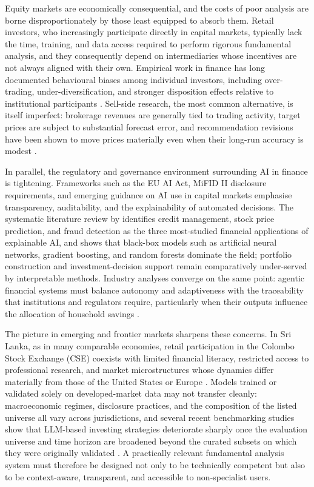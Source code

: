 Equity markets are economically consequential, and the costs of poor analysis are borne disproportionately by those least equipped to absorb them. Retail investors, who increasingly participate directly in capital markets, typically lack the time, training, and data access required to perform rigorous fundamental analysis, and they consequently depend on intermediaries whose incentives are not always aligned with their own. Empirical work in finance has long documented behavioural biases among individual investors, including over-trading, under-diversification, and stronger disposition effects relative to institutional participants \citep{Li2025FSA}. Sell-side research, the most common alternative, is itself imperfect: brokerage revenues are generally tied to trading activity, target prices are subject to substantial forecast error, and recommendation revisions have been shown to move prices materially even when their long-run accuracy is modest \citep{Papasotiriou2024}.

In parallel, the regulatory and governance environment surrounding AI in finance is tightening. Frameworks such as the EU AI Act, MiFID II disclosure requirements, and emerging guidance on AI use in capital markets emphasise transparency, auditability, and the explainability of automated decisions. The systematic literature review by \citet{Cernevicene2024} identifies credit management, stock price prediction, and fraud detection as the three most-studied financial applications of explainable AI, and shows that black-box models such as artificial neural networks, gradient boosting, and random forests dominate the field; portfolio construction and investment-decision support remain comparatively under-served by interpretable methods. Industry analyses converge on the same point: agentic financial systems must balance autonomy and adaptiveness with the traceability that institutions and regulators require, particularly when their outputs influence the allocation of household savings \citep{Acharya2025AgenticAI}.

The picture in emerging and frontier markets sharpens these concerns. In Sri Lanka, as in many comparable economies, retail participation in the Colombo Stock Exchange (CSE) coexists with limited financial literacy, restricted access to professional research, and market microstructures whose dynamics differ materially from those of the United States or Europe \citep{Bangun2025}. Models trained or validated solely on developed-market data may not transfer cleanly: macroeconomic regimes, disclosure practices, and the composition of the listed universe all vary across jurisdictions, and several recent benchmarking studies show that LLM-based investing strategies deteriorate sharply once the evaluation universe and time horizon are broadened beyond the curated subsets on which they were originally validated \citep{Li2026FINSABER}. A practically relevant fundamental analysis system must therefore be designed not only to be technically competent but also to be context-aware, transparent, and accessible to non-specialist users.


